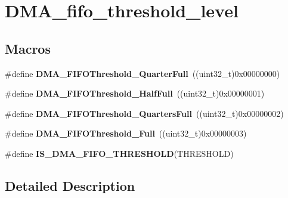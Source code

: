 \hypertarget{group___d_m_a__fifo__threshold__level}{\section{D\-M\-A\-\_\-fifo\-\_\-threshold\-\_\-level}
\label{group___d_m_a__fifo__threshold__level}
}
\subsection*{Macros}
\begin{DoxyCompactItemize}
\item 
\hypertarget{group___d_m_a__fifo__threshold__level_gacc98384bbba43a9c4f70b448518acfe4}{\#define {\bfseries D\-M\-A\-\_\-\-F\-I\-F\-O\-Threshold\-\_\-Quarter\-Full}~((uint32\-\_\-t)0x00000000)}\label{group___d_m_a__fifo__threshold__level_gacc98384bbba43a9c4f70b448518acfe4}

\item 
\hypertarget{group___d_m_a__fifo__threshold__level_ga626b546865960343fdcfdf33ac8ceb03}{\#define {\bfseries D\-M\-A\-\_\-\-F\-I\-F\-O\-Threshold\-\_\-\-Half\-Full}~((uint32\-\_\-t)0x00000001)}\label{group___d_m_a__fifo__threshold__level_ga626b546865960343fdcfdf33ac8ceb03}

\item 
\hypertarget{group___d_m_a__fifo__threshold__level_ga6f041008fce4bb341f9a518d803a308b}{\#define {\bfseries D\-M\-A\-\_\-\-F\-I\-F\-O\-Threshold\-\_\-Quarters\-Full}~((uint32\-\_\-t)0x00000002)}\label{group___d_m_a__fifo__threshold__level_ga6f041008fce4bb341f9a518d803a308b}

\item 
\hypertarget{group___d_m_a__fifo__threshold__level_ga9f1008e0df7d41d910ed89d7e0872e69}{\#define {\bfseries D\-M\-A\-\_\-\-F\-I\-F\-O\-Threshold\-\_\-\-Full}~((uint32\-\_\-t)0x00000003)}\label{group___d_m_a__fifo__threshold__level_ga9f1008e0df7d41d910ed89d7e0872e69}

\item 
\#define {\bfseries I\-S\-\_\-\-D\-M\-A\-\_\-\-F\-I\-F\-O\-\_\-\-T\-H\-R\-E\-S\-H\-O\-L\-D}(T\-H\-R\-E\-S\-H\-O\-L\-D)
\end{DoxyCompactItemize}


\subsection{Detailed Description}


